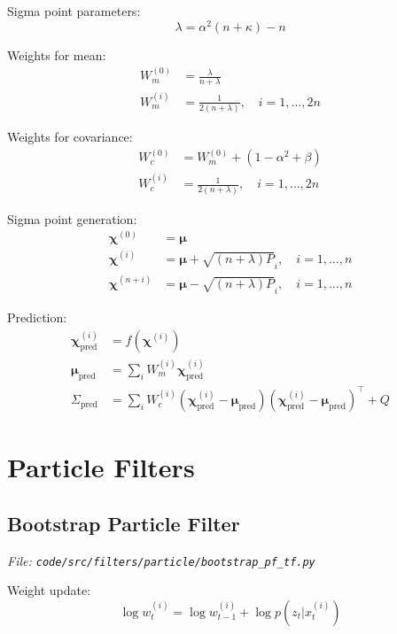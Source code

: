 \documentclass[12pt]{article}
\begin{document}
Sigma point parameters:
\begin{equation}
\lambda = \alpha^2(n + \kappa) - n
\end{equation}

Weights for mean:
\begin{align}
W_m^{(0)} &= \frac{\lambda}{n + \lambda} \\
W_m^{(i)} &= \frac{1}{2(n + \lambda)}, \quad i = 1, \ldots, 2n
\end{align}

Weights for covariance:
\begin{align}
W_c^{(0)} &= W_m^{(0)} + (1 - \alpha^2 + \beta) \\
W_c^{(i)} &= \frac{1}{2(n + \lambda)}, \quad i = 1, \ldots, 2n
\end{align}

Sigma point generation:
\begin{align}
\boldsymbol{\chi}^{(0)} &= \boldsymbol{\mu} \\
\boldsymbol{\chi}^{(i)} &= \boldsymbol{\mu} + \sqrt{(n+\lambda)P}_i, \quad i = 1, \ldots, n \\
\boldsymbol{\chi}^{(n+i)} &= \boldsymbol{\mu} - \sqrt{(n+\lambda)P}_i, \quad i = 1, \ldots, n
\end{align}

Prediction:
\begin{align}
\boldsymbol{\chi}_{\text{pred}}^{(i)} &= f(\boldsymbol{\chi}^{(i)}) \\
\boldsymbol{\mu}_{\text{pred}} &= \sum_i W_m^{(i)} \boldsymbol{\chi}_{\text{pred}}^{(i)} \\
\Sigma_{\text{pred}} &= \sum_i W_c^{(i)} (\boldsymbol{\chi}_{\text{pred}}^{(i)} - \boldsymbol{\mu}_{\text{pred}})(\boldsymbol{\chi}_{\text{pred}}^{(i)} - \boldsymbol{\mu}_{\text{pred}})^\top + Q
\end{align}

\section{Particle Filters}

\subsection{Bootstrap Particle Filter}
\textit{File: \texttt{code/src/filters/particle/bootstrap\_pf\_tf.py}}

Weight update:
\begin{equation}
\log w_t^{(i)} = \log w_{t-1}^{(i)} + \log p(z_t | x_t^{(i)})
\end{equation}
\end{document}
